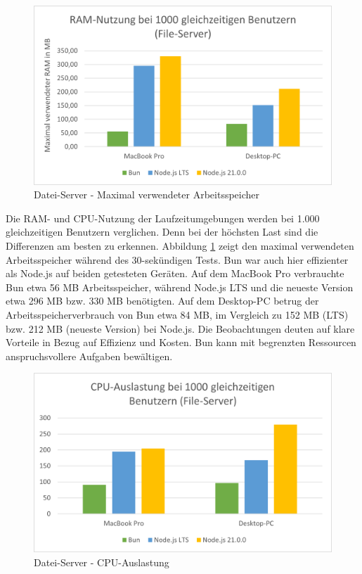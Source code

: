 \begin{figure}[h!]
	\centering
	\includegraphics[width=\linewidth]{./images/fileServerRamUsage.png}
	\caption{Datei-Server - Maximal verwendeter Arbeitsspeicher}
	\label{fig:fileServerRamUsage}
\end{figure}


\noindent
Die RAM- und CPU-Nutzung der Laufzeitumgebungen werden bei 1.000 gleichzeitigen Benutzern verglichen. Denn bei der höchsten Last sind die Differenzen am besten zu erkennen. Abbildung \ref{fig:fileServerRamUsage} zeigt den maximal verwendeten Arbeitsspeicher während des 30-sekündigen Tests. Bun war auch hier effizienter als Node.js auf beiden getesteten Geräten. Auf dem MacBook Pro verbrauchte Bun etwa 56 MB Arbeitsspeicher, während Node.js LTS und die neueste Version etwa 296 MB bzw. 330 MB benötigten. Auf dem Desktop-PC betrug der Arbeitsspeicherverbrauch von Bun etwa 84 MB, im Vergleich zu 152 MB (LTS) bzw. 212 MB (neueste Version) bei Node.js. Die Beobachtungen deuten auf klare Vorteile in Bezug auf Effizienz und Kosten. Bun kann mit begrenzten Ressourcen anspruchsvollere Aufgaben bewältigen.\\

\begin{figure}[h!]
	\centering
	\includegraphics[width=\linewidth]{./images/fileServerCpuUsage.png}
	\caption{Datei-Server - CPU-Auslastung }
	\label{fig:fileServerCpuUsage}
\end{figure}

